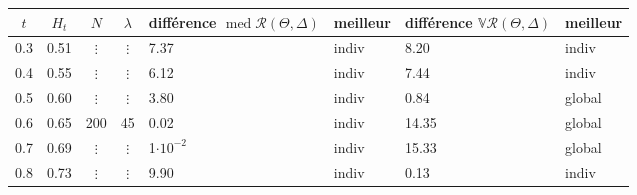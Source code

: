 \begin{table}[H]
\begin{tabularx}{\textwidth}{ccccXXXX}
	\toprule
	$t$ & $H_t$ & $N$      & $\lambda$ & différence $\operatorname{med} \mathcal R(\Theta, \Delta)$ & \textbf{meilleur} & différence  $\mathds V \mathcal R(\Theta, \Delta)$ & \textbf{meilleur} \\
	\midrule

	0.3 & 0.51  & $\vdots$ & $\vdots$  & 7.37                                                       & indiv             & 8.20                                               & indiv             \\
	0.4 & 0.55  & $\vdots$ & $\vdots$  & 6.12                                                       & indiv             & 7.44                                               & indiv             \\
	0.5 & 0.60  & $\vdots$ & $\vdots$  & 3.80                                                       & indiv             & 0.84                                               & global            \\
	0.6 & 0.65  & 200      & 45        & 0.02                                                       & indiv             & 14.35                                              & global            \\
	0.7 & 0.69  & $\vdots$ & $\vdots$  & 1$\cdot 10^{-2}$                                           & indiv             & 15.33                                              & global            \\
	0.8 & 0.73  & $\vdots$ & $\vdots$  & 9.90                                                       & indiv             & 0.13                                               & indiv             \\


\end{tabularx}
\end{table}
